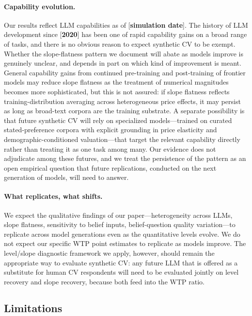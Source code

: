 \documentclass[12pt]{article}
\begin{document}
\paragraph{Capability evolution.} Our results reflect LLM capabilities
as of [\textbf{simulation date}]. The history of LLM development since
[\textbf{2020}] has been one of rapid capability gains on a broad range
of tasks, and there is no obvious reason to expect synthetic CV to be
exempt. Whether the slope-flatness pattern we document will abate as
models improve is genuinely unclear, and depends in part on which kind
of improvement is meant. General capability gains from continued
pre-training and post-training of frontier models may reduce slope
flatness as the treatment of numerical magnitudes becomes more
sophisticated, but this is not assured: if slope flatness reflects
training-distribution averaging across heterogeneous price effects, it
may persist as long as broad-text corpora are the training substrate.
A separate possibility is that future synthetic CV will rely on
specialized models---trained on curated stated-preference corpora with
explicit grounding in price elasticity and demographic-conditioned
valuation---that target the relevant capability directly rather than
treating it as one task among many. Our evidence does not adjudicate
among these futures, and we treat the persistence of the pattern as an
open empirical question that future replications, conducted on the next
generation of models, will need to answer.

\paragraph{What replicates, what shifts.} We expect the qualitative
findings of our paper---heterogeneity across LLMs, slope flatness,
sensitivity to belief inputs, belief-question quality variation---to
replicate across model generations even as the quantitative levels
evolve. We do not expect our specific WTP point estimates to replicate
as models improve. The level/slope diagnostic framework we apply,
however, should remain the appropriate way to evaluate synthetic CV:
any future LLM that is offered as a substitute for human CV respondents
will need to be evaluated jointly on level recovery and slope recovery,
because both feed into the WTP ratio.

\subsection{Limitations}\label{sec:disc-limitations}
\end{document}
